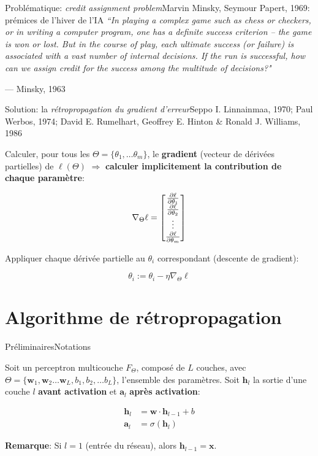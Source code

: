 \documentclass[12pt,dvipsnames,aspectratio=169]{beamer}
\newcommand{\x}[0]{\mathbf{x}}
\newcommand{\w}[0]{\mathbf{w}}
\newcommand{\hl}[0]{\mathbf{h}_l}
\newcommand{\hli}[0]{\mathbf{h}_{l-1}}
\newcommand{\al}[0]{\mathbf{a}_{l}}
\begin{document}
\begin{frame}{Problématique: \textit{credit assignment problem}}{Marvin Minsky, Seymour Papert, 1969: prémices de l'hiver de l'IA}
\textit{“In playing a complex game such as chess or checkers, or in writing a computer program, one has a definite success criterion – the game is won or lost. But in the course of play, each ultimate success (or failure) is associated with a vast number of internal decisions. If the run is successful, how can we assign credit for the success among the multitude of decisions?"}

--- Minsky, 1963

\end{frame}


\begin{frame}{Solution: la \textit{rétropropagation du gradient d'erreur}}{Seppo I. Linnainmaa, 1970; Paul Werbos, 1974; David E. Rumelhart, Geoffrey E. Hinton \& Ronald J. Williams, 1986}

Calculer, pour tous les $\Theta = \{\theta_1, \dots \theta_m\}$, le \textbf{gradient} (vecteur de dérivées partielles) de $\ell(\Theta)$ $\Rightarrow$ \textbf{calculer implicitement la contribution de chaque paramètre}:

$$
\nabla_\Theta\ell = \begin{bmatrix}
                        \pdv{\ell}{\theta_1} \\
                        \pdv{\ell}{\theta_2} \\
                        \vdots \\
                        \pdv{\ell}{\theta_m}
                    \end{bmatrix}
$$

Appliquer chaque dérivée partielle au $\theta_i$ correspondant (descente de gradient):

$$
\theta_i := \theta_i - \eta \nabla_\Theta\ell
$$

\end{frame}


\section{Algorithme de rétropropagation}

\begin{frame}{Préliminaires}{Notations}

Soit un perceptron multicouche $F_\Theta$, composé de $L$ couches, avec $\Theta = \{\w_1, \w_2 \dots \w_L, b_1, b_2, \dots b_L\}$, l'ensemble des paramètres. Soit $\hl$ la sortie d'une couche $l$ \textbf{avant activation} et $\al$ \textbf{après activation}:

\begin{align*}
    \hl &= \w \cdot \hli + b \\
    \al &= \sigma(\hl)
\end{align*}

\textbf{Remarque}: Si $l=1$ (entrée du réseau), alors $\hli=\x$.
    
\end{frame}
\end{document}
